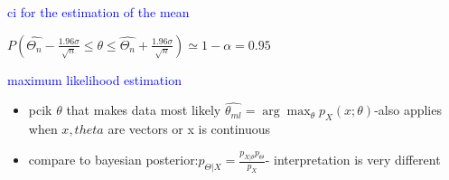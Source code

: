 \textcolor{blue}{ci for the estimation of the mean}

$P(\hat{\Theta_n}-\frac{1.96\sigma}{\sqrt{n}}\le \theta \le \hat{\Theta_n}+\frac{1.96\sigma}{\sqrt{n}})\simeq 1-\alpha=0.95$


\textcolor{blue}{maximum likelihood estimation}

\begin{itemize}
    \item pcik $\theta$ that makes data most likely $\hat{\theta_{ml}}=\arg \max_\theta p_X(x;\theta)$-also applies when $x,theta$ are vectors or x is continuous
    \item compare to bayesian posterior:$p_{\Theta|X}=\frac{p_{X|\theta}p_\Theta}{p_X}$- interpretation is very different
\end{itemize}